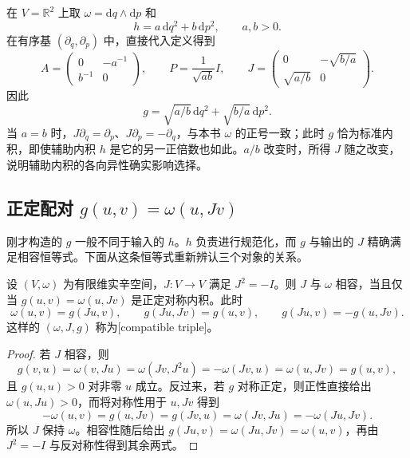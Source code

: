 \begin{example}\label{g4:exm:0703:anisotropic-metric}
	在 \(V=\mathbb R^2\) 上取 \(\omega=\mathrm{d}q\wedge\mathrm{d}p\) 和
	\[
		h=a\,\mathrm{d}q^2+b\,\mathrm{d}p^2,\qquad a,b>0.
	\]
	在有序基 \((\partial_q,\partial_p)\) 中，直接代入定义得到
	\[
		A=\begin{pmatrix}0&-a^{-1}\\b^{-1}&0\end{pmatrix},\qquad
		P=\frac1{\sqrt{ab}}I,\qquad
		J=\begin{pmatrix}0&-\sqrt{b/a}\\\sqrt{a/b}&0\end{pmatrix}.
	\]
	因此
	\[
		g=\sqrt{a/b}\,\mathrm{d}q^2+\sqrt{b/a}\,\mathrm{d}p^2.
	\]
	当 \(a=b\) 时，\(J\partial_q=\partial_p\)、\(J\partial_p=-\partial_q\)，与本书 \(\omega\) 的正号一致；此时 \(g\) 恰为标准内积，即使辅助内积 \(h\) 是它的另一正倍数也如此。\(a/b\) 改变时，所得 \(J\) 随之改变，说明辅助内积的各向异性确实影响选择。
\end{example}

\subsection{\texorpdfstring{正定配对 \(g(u,v)=\omega(u,Jv)\)}{正定配对 g(u,v)=\GeometryPdfSmallOmega{}(u,Jv)}}
\label{g4:subsec:0703:02}

刚才构造的 \(g\) 一般不同于输入的 \(h\)。\(h\) 负责进行规范化，而 \(g\) 与输出的 \(J\) 精确满足相容恒等式。下面从这条恒等式重新辨认三个对象的关系。

\begin{proposition}\label{g4:prop:0703:compatible-triple}
	设 \((V,\omega)\) 为有限维实辛空间，\(J:V\to V\) 满足 \(J^2=-I\)。则 \(J\) 与 \(\omega\) 相容，当且仅当 \(g(u,v)=\omega(u,Jv)\) 是正定对称内积。此时
	\begin{equation}\label{g4:eq:0703:triple-identities}
		\omega(u,v)=g(Ju,v),\qquad
		g(Ju,Jv)=g(u,v),\qquad
		g(Ju,v)=-g(u,Jv).
	\end{equation}
	这样的 \((\omega,J,g)\) 称为[compatible triple]。
\end{proposition}
\begin{proof}
	若 \(J\) 相容，则
	\[
		g(v,u)=\omega(v,Ju)
		=\omega(Jv,J^2u)=-\omega(Jv,u)=\omega(u,Jv)=g(u,v),
	\]
	且 \(g(u,u)>0\) 对非零 \(u\) 成立。反过来，若 \(g\) 对称正定，则正性直接给出 \(\omega(u,Ju)>0\)，而将对称性用于 \(u,Jv\) 得到
	\[
		-\omega(u,v)=g(u,Jv)=g(Jv,u)=\omega(Jv,Ju)=-\omega(Ju,Jv).
	\]
	所以 \(J\) 保持 \(\omega\)。相容性随后给出 \(g(Ju,v)=\omega(Ju,Jv)=\omega(u,v)\)，再由 \(J^2=-I\) 与反对称性得到其余两式。
\end{proof}

